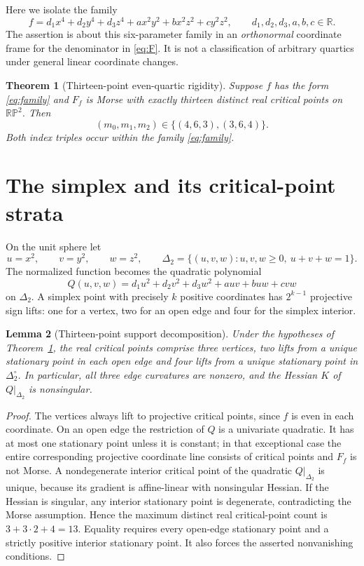\documentclass[10pt,a4paper]{article}
\theoremstyle{plain}
\newtheorem{theorem}{Theorem}
\newtheorem{lemma}[theorem]{Lemma}
\theoremstyle{remark}
\newcommand{\RP}{\mathbb{RP}}
\begin{document}
Here we isolate the family
\begin{equation}\label{eq:family}
 f=d_1x^4+d_2y^4+d_3z^4+ax^2y^2+bx^2z^2+cy^2z^2,
 \qquad d_1,d_2,d_3,a,b,c\in\mathbb R.
\end{equation}
The assertion is about this six-parameter family in an \emph{orthonormal} coordinate frame for the denominator in \eqref{eq:F}. It is not a classification of arbitrary quartics under general linear coordinate changes.

\begin{theorem}[Thirteen-point even-quartic rigidity]\label{thm:main}
Suppose $f$ has the form \eqref{eq:family} and $F_f$ is Morse with exactly thirteen distinct real critical points on $\RP^2$. Then
\begin{equation}\label{eq:claim}
 (m_0,m_1,m_2)\in\{(4,6,3),(3,6,4)\}.
\end{equation}
Both index triples occur within the family \eqref{eq:family}.
\end{theorem}

\section{The simplex and its critical-point strata}
On the unit sphere let
\[
 u=x^2,\qquad v=y^2,\qquad w=z^2,\qquad
 \Delta_2=\{(u,v,w):u,v,w\ge0,\ u+v+w=1\}.
\]
The normalized function becomes the quadratic polynomial
\begin{equation}\label{eq:Q}
 Q(u,v,w)=d_1u^2+d_2v^2+d_3w^2+auv+buw+cvw
\end{equation}
on $\Delta_2$. A simplex point with precisely $k$ positive coordinates has $2^{k-1}$ projective sign lifts: one for a vertex, two for an open edge and four for the simplex interior.

\begin{lemma}[Thirteen-point support decomposition]\label{lem:support}
Under the hypotheses of Theorem~\ref{thm:main}, the real critical points comprise three vertices, two lifts from a unique stationary point in each open edge and four lifts from a unique stationary point in $\Delta_2^\circ$. In particular, all three edge curvatures are nonzero, and the Hessian $K$ of $Q|_{\Delta_2}$ is nonsingular.
\end{lemma}
\begin{proof}
The vertices always lift to projective critical points, since $f$ is even in each coordinate. On an open edge the restriction of $Q$ is a univariate quadratic. It has at most one stationary point unless it is constant; in that exceptional case the entire corresponding projective coordinate line consists of critical points and $F_f$ is not Morse. A nondegenerate interior critical point of the quadratic $Q|_{\Delta_2}$ is unique, because its gradient is affine-linear with nonsingular Hessian. If the Hessian is singular, any interior stationary point is degenerate, contradicting the Morse assumption. Hence the maximum distinct real critical-point count is $3+3\cdot2+4=13$. Equality requires every open-edge stationary point and a strictly positive interior stationary point. It also forces the asserted nonvanishing conditions.
\end{proof}
\end{document}
